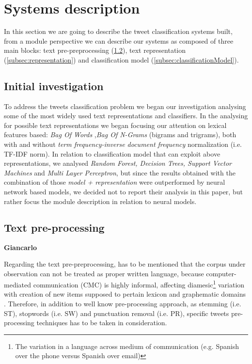 \section{Systems description} \label{sec:system}

In this section we are going to describe the tweet classification systems built, from a module perspective we can describe our systems as composed of three main blocks: text pre-preprocessing (\cref{subsec:preprocessing}),  text representation (\cref{subsec:representation}) and classification model (\cref{subsec:classificationModel}). 


\subsection{Initial investigation} \label{subsec:boh}
To address the tweets classification problem we began our investigation analysing some of the most widely used text representations and classifiers.
In the analysing for possible text representations we began focusing our attention on lexical features based: \emph{Bag Of Words} \cite{harris1954distributional},\emph{Bag Of N-Grams} (bigrams and trigrams), both with and without \emph{term frequency-inverse document frequency} normalization (i.e. TF-IDF norm).
In relation to classification model that can exploit above representations,  we analysed \emph{Random Forest, Decision Trees, Support Vector Machines} and \emph{Multi Layer Perceptron}, but since the results obtained with the combination of those \emph{model + representation} were outperformed by neural network based models, we decided not to report their analysis in this paper, but rather focus the module description in relation to neural models.


\subsection{Text pre-processing} \label{subsec:preprocessing}


\textbf{Giancarlo}

Regarding the text pre-preprocessing, has to be mentioned that the corpus under observation can not be treated as proper written language, because computer-mediated communication (CMC) is highly informal, affecting diamesic\footnote{The variation in a language across medium of communication (e.g. Spanish over the phone versus Spanish over email)} variation with creation of new items supposed to pertain lexicon and graphematic domains \cite{bazzanella2011oscillazioni,cerruti2013netspeak}.
Therefore, in addition to well know pre-processing approach, as stemming (i.e. ST), stopwords (i.e. SW) and punctuation removal (i.e. PR), specific tweets pre-processing techniques has to be taken in consideration.

